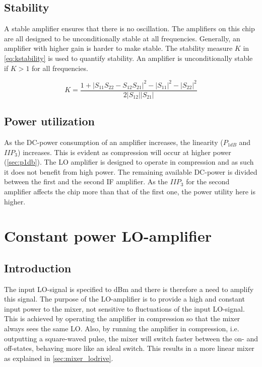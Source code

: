 		\subsection{Stability}
			A stable amplifier ensures that there is no oscillation.\autocite{grosch99} The amplifiers on this chip are all designed to be unconditionally stable at all frequencies. Generally, an amplifier with higher gain is harder to make stable. The stability measure $K$ in \autoref{eq:kstability} is used to quantify stability. An amplifier is unconditionally stable if $K>1$ for all frequencies.

			\begin{equation}\label{eq:kstability}
				K=\frac{1+|S_{11}S_{22}-S_{12}S_{21}|^2-|S_{11}|^2-|S_{22}|^2}{2|S_{12}||S_{21}|}
			\end{equation}

		\subsection{Power utilization}\label{sec:power}
			As the DC-power consumption of an amplifier increases, the linearity ($P_{1dB}$ and $IIP_3$) increases. This is evident as compression will occur at higher power (\autoref{sec:p1db}). The LO amplifier is designed to operate in compression and as such it does not benefit from high power. The remaining available DC-power is divided between the first and the second IF amplifier. As the $IIP_3$ for the second amplifier affects the chip more than that of the first one, the power utility here is higher.

	\section{Constant power LO-amplifier}\label{sec:lo_amp}
		\subsection{Introduction}
			The input LO-signal is specified to \unit[-5--0]{dBm} and there is therefore a need to amplify this signal. The purpose of the LO-amplifier is to provide a high and constant input power to the mixer, not sensitive to fluctuations of the input LO-signal. This is achieved by operating the amplifier in compression so that the mixer always sees the same LO. Also, by running the amplifier in compression, i.e. outputting a square-waved pulse, the mixer will switch faster between the on- and off-states, behaving more like an ideal switch. This results in a more linear mixer as explained in \autoref{sec:mixer_lodrive}.\autocite{vice03} %



